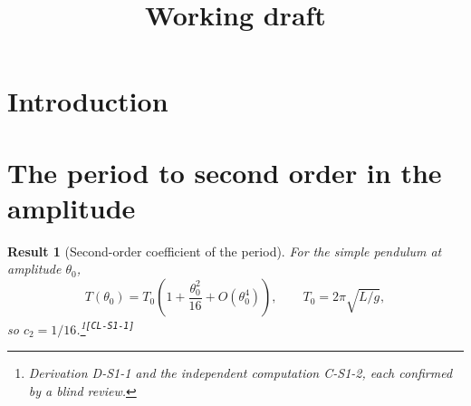 \documentclass[11pt]{article}
\title{Working draft}
\author{}
\date{}
\newtheorem{result}{Result}
\newcommand{\card}[1]{\textsuperscript{\texttt{[#1]}}}
\begin{document}
\maketitle

\begin{abstract}
\end{abstract}

\section{Introduction}

%
%

\section{The period to second order in the amplitude}

\begin{result}[Second-order coefficient of the period]
For the simple pendulum at amplitude $\theta_0$,
\begin{equation}
  T(\theta_0) = T_0\left(1 + \frac{\theta_0^2}{16} + O(\theta_0^4)\right),
  \qquad T_0 = 2\pi\sqrt{L/g},
  \label{eq:result}
\end{equation}
so $c_2 = 1/16$.\footnote{Derivation D-S1-1 and the independent computation
C-S1-2, each confirmed by a blind review.}\card{CL-S1-1}
\end{result}



\end{document}
